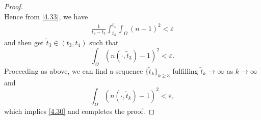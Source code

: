 \documentclass[12pt]{article}
\theoremstyle{plain}
\theoremstyle{definition}
\numberwithin{equation}{section}
\begin{document}
\begin{proof}[Proof]
$$$$
Hence from \eqref{4.33}, we have
\begin{equation*}
\begin{split}
\frac{1}{t_4-t_3}\int^{t_4}_{t_3}\int_\Omega(n-1)^2
< \varepsilon\end{split}
\end{equation*}
and then get $\tilde{t}_3\in (t_3,t_4)$ such that
\begin{equation}
\int_\Omega(n(\cdot,\tilde{t}_3)-1)^2
< \varepsilon.
\end{equation}
Proceeding as above, we can find a sequence $\{\tilde{t}_k\}_{k\geq 3}$ fulfilling
$\tilde{t}_k\rightarrow \infty$ as $k\rightarrow \infty$ and
\begin{equation*}
\int_\Omega(n(\cdot,\tilde{t}_k)-1)^2< \varepsilon,
\end{equation*}
which implies \eqref{4.30} and completes the proof.
\end{proof}
\end{document}
